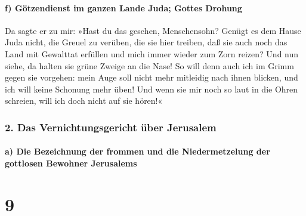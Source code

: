 \hypertarget{f-guxf6tzendienst-im-ganzen-lande-juda-gottes-drohung}{%
\paragraph{f) Götzendienst im ganzen Lande Juda; Gottes
Drohung}\label{f-guxf6tzendienst-im-ganzen-lande-juda-gottes-drohung}}

Da sagte er zu mir: »Hast du das gesehen, Menschensohn?
Genügt es dem Hause Juda nicht, die Greuel zu verüben, die sie hier
treiben, daß sie auch noch das Land mit Gewalttat erfüllen und mich
immer wieder zum Zorn reizen? Und nun siehe, da halten sie grüne Zweige
an die Nase! So will denn auch ich im Grimm gegen sie
vorgehen: mein Auge soll nicht mehr mitleidig nach ihnen blicken, und
ich will keine Schonung mehr üben! Und wenn sie mir noch so laut in die
Ohren schreien, will ich doch nicht auf sie hören!«

\hypertarget{das-vernichtungsgericht-uxfcber-jerusalem}{%
\subsubsection{2. Das Vernichtungsgericht über
Jerusalem}\label{das-vernichtungsgericht-uxfcber-jerusalem}}

\hypertarget{a-die-bezeichnung-der-frommen-und-die-niedermetzelung-der-gottlosen-bewohner-jerusalems}{%
\paragraph{a) Die Bezeichnung der frommen und die Niedermetzelung der
gottlosen Bewohner
Jerusalems}\label{a-die-bezeichnung-der-frommen-und-die-niedermetzelung-der-gottlosen-bewohner-jerusalems}}

\hypertarget{section-8}{%
\section{9}\label{section-8}}

